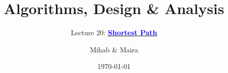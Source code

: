 \documentclass[10pt,aspectratio=43]{beamer}
\title{Algorithms, Design \& Analysis}
\subtitle{Lecture 20: \href{https://docs.google.com/document/d/1RkYqY9OvATMPILDVtHyNG_6apl93wdmuoxnDB3_DeLw/edit?usp=sharing}{\textcolor{blue}{\textbf{Shortest Path}}}}
\author[bscs23168 \& bscs23149]{Mihab \& Maira}
\institute[ITU]{Information Technology University}
\date{\today}
\begin{document}
\begin{frame}
    \titlepage
\end{frame}



\end{document}
